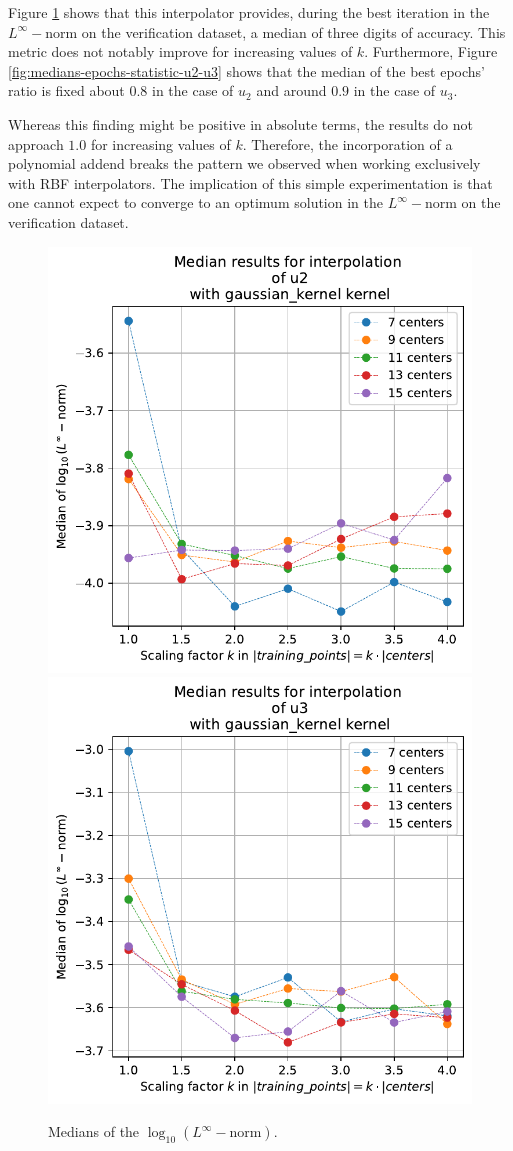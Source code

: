 \documentclass[12pt]{report} %
\begin{document}
Figure \ref{fig:medians-linf-statistic-u2-u3} shows that this interpolator provides, during the best iteration in the $L^\infty-$norm on the verification dataset, a median of three digits of accuracy. This metric does not notably improve for increasing values of $k$. Furthermore, Figure \ref{fig:medians-epochs-statistic-u2-u3} shows that the median of the best epochs' ratio is fixed about $0.8$ in the case of $u_2$ and around $0.9$ in the case of $u_3$. 

Whereas this finding might be positive in absolute terms, the results do not approach $1.0$ for increasing values of $k$. Therefore, the incorporation of a polynomial addend breaks the pattern we observed when working exclusively with RBF interpolators. The implication of this simple experimentation is that one cannot expect to converge to an optimum solution in the $L^\infty-$norm on the verification dataset.


\begin{figure}[H]
  
  {\includegraphics[height=.45\textwidth]
    {imagenes/experiments/1d/statistical_1d_full/u2/medians_linf_u2_gaussian_kernel.pdf}}
  {\includegraphics[height=.45\textwidth]
    {imagenes/experiments/1d/statistical_1d_full/u3/medians_linf_u3_gaussian_kernel.pdf}}
  \caption{Medians of the $\log_{10}(L^\infty-\text{norm})$.}
  \label{fig:medians-linf-statistic-u2-u3}
\end{figure}
\end{document}
